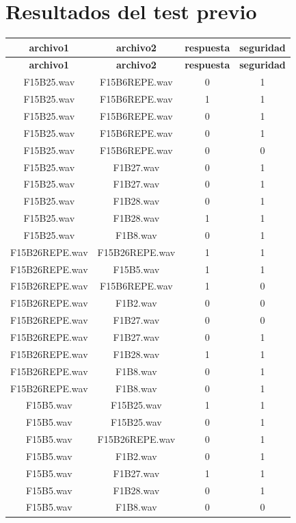 \documentclass[11pt,a4paper]{book}
\begin{document}
\section{Resultados del test previo}
\scriptsize
\begin{longtable}[c]{|c|c|c|c|}
		\hline
		\textbf{archivo1}&\textbf{archivo2}&\textbf{respuesta}&\textbf{seguridad}\\ \hline
		\endfirsthead
		\hline
		\textbf{archivo1}&\textbf{archivo2}&\textbf{respuesta}&\textbf{seguridad}\\ \hline
		\endhead
		
		F15B25.wav&F15B6REPE.wav&0&1\\ \hline
F15B25.wav&F15B6REPE.wav&1&1\\ \hline
F15B25.wav&F15B6REPE.wav&0&1\\ \hline
F15B25.wav&F15B6REPE.wav&0&1\\ \hline
F15B25.wav&F15B6REPE.wav&0&0\\ \hline
F15B25.wav&F1B27.wav&0&1\\ \hline
F15B25.wav&F1B27.wav&0&1\\ \hline
F15B25.wav&F1B28.wav&0&1\\ \hline
F15B25.wav&F1B28.wav&1&1\\ \hline
F15B25.wav&F1B8.wav&0&1\\ \hline
F15B26REPE.wav&F15B26REPE.wav&1&1\\ \hline
F15B26REPE.wav&F15B5.wav&1&1\\ \hline
F15B26REPE.wav&F15B6REPE.wav&1&0\\ \hline
F15B26REPE.wav&F1B2.wav&0&0\\ \hline
F15B26REPE.wav&F1B27.wav&0&0\\ \hline
F15B26REPE.wav&F1B27.wav&0&1\\ \hline
F15B26REPE.wav&F1B28.wav&1&1\\ \hline
F15B26REPE.wav&F1B8.wav&0&1\\ \hline
F15B26REPE.wav&F1B8.wav&0&1\\ \hline
F15B5.wav&F15B25.wav&1&1\\ \hline
F15B5.wav&F15B25.wav&0&1\\ \hline
F15B5.wav&F15B26REPE.wav&0&1\\ \hline
F15B5.wav&F1B2.wav&0&1\\ \hline
F15B5.wav&F1B27.wav&1&1\\ \hline
F15B5.wav&F1B28.wav&0&1\\ \hline
F15B5.wav&F1B8.wav&0&0\\ \hline

\end{longtable}
\end{document}
